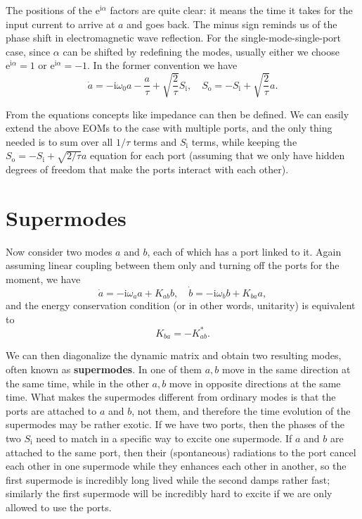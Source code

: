 \documentclass[hyperref, a4paper]{article}
\newcommand*{\ii}{\mathrm{i}}
\newcommand*{\ee}{\mathrm{e}}
\newcommand*{\concept}[1]{{\textbf{#1}}}
\newcommand*{\Si}{S_{\text{i}}}
\newcommand*{\So}{S_{\text{o}}}
\begin{document}
The positions of the $\ee^{\ii \alpha}$ factors are quite clear:
it means the time it takes for the input current to arrive at $a$ and goes back.
The minus sign reminds us of the phase shift in electromagnetic wave reflection.
For the single-mode-single-port case,
since $\alpha$ can be shifted by redefining the modes, 
usually either we choose $\ee^{\ii \alpha} = 1$ or $\ee^{\ii \alpha} = -1$.
In the former convention we have 
\begin{equation}
    \dot{a} = - \ii \omega_0 a - \frac{a}{\tau} + \sqrt{\frac{2}{\tau}} \Si, \quad 
    \So = - \Si + \sqrt{\frac{2}{\tau}} a. 
\end{equation}


From the equations concepts like impedance can then be defined. 
We can easily extend the above EOMs to the case with multiple ports, 
and the only thing needed is to sum over all $1/\tau$ terms and $\Si$ terms, 
while keeping the $\So = - \Si + \sqrt{2/\tau} a$ equation for each port 
(assuming that we only have hidden degrees of freedom that make the ports interact with each other).

\section{Supermodes}

Now consider two modes $a$ and $b$, 
each of which has a port linked to it.
Again assuming linear coupling between them only and turning off the ports for the moment, we have 
\begin{equation}
    \dot{a} = - \ii \omega_a a + K_{ab} b, \quad 
    \dot{b} = - \ii \omega_b b + K_{ba} a,
\end{equation}
and the energy conservation condition (or in other words, unitarity) is equivalent to
\begin{equation}
    K_{ba} = - K_{ab}^*.
\end{equation}

We can then diagonalize the dynamic matrix and obtain two resulting modes, 
often known as \concept{supermodes}.
In one of them $a, b$ move in the same direction at the same time, 
while in the other $a, b$ move in opposite directions at the same time.
What makes the supermodes different from ordinary modes is that 
the ports are attached to $a$ and $b$, not them, 
and therefore the time evolution of the supermodes may be rather exotic.
If we have two ports, then the phases of the two $\Si$ need to match in a specific way 
to excite one supermode. 
If $a$ and $b$ are attached to the same port, 
then their (spontaneous) radiations to the port cancel each other in one supermode 
while they enhances each other in another, 
so the first supermode is incredibly long lived 
while the second damps rather fast; 
similarly the first supermode will be incredibly hard to excite 
if we are only allowed to use the ports.
\end{document}
